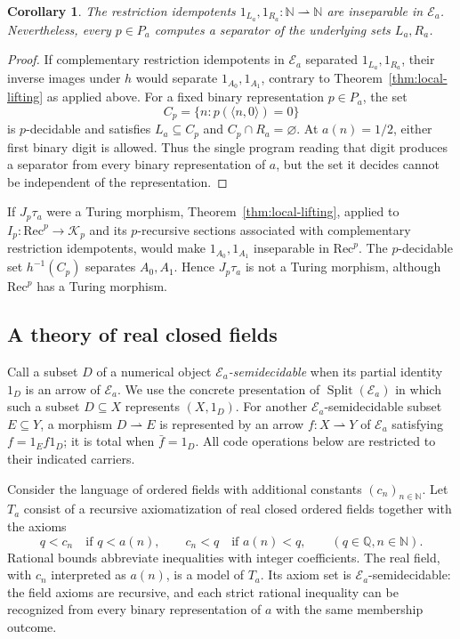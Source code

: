 \documentclass[11pt]{article}
\newtheorem{corollary}[theorem]{Corollary}
\newcommand{\N}{\mathbb N}
\begin{document}
\begin{corollary}\label{cor:miller-cuts-inseparable}
The restriction idempotents $1_{L_a},1_{R_a}:\N\rightharpoonup\N$ are inseparable in
$\mathcal E_a$. Nevertheless, every $p\in P_a$ computes a separator
of the underlying sets $L_a,R_a$.
\end{corollary}
\begin{proof}
If complementary restriction idempotents in $\mathcal E_a$ separated
$1_{L_a},1_{R_a}$, their inverse images under $h$ would separate
$1_{A_0},1_{A_1}$, contrary to
Theorem~\ref{thm:local-lifting} as applied above.
For a fixed binary representation $p\in P_a$, the set
\[
 C_p=\{n:p(\langle n,0\rangle)=0\}
\]
is $p$-decidable and satisfies $L_a\subseteq C_p$ and
$C_p\cap R_a=\varnothing$. At $a(n)=1/2$, either first binary digit
is allowed. Thus the single program reading that digit produces a
separator from every binary representation of $a$, but the set it decides
cannot be independent of the representation.
\end{proof}

If $J_p\tau_a$ were a Turing morphism, Theorem~\ref{thm:local-lifting},
applied to $I_p:\mathrm{Rec}^{p}\to\mathcal K_p$ and its
$p$-recursive sections associated with complementary restriction
idempotents, would make $1_{A_0},1_{A_1}$ inseparable in
$\mathrm{Rec}^{p}$. The $p$-decidable set $h^{-1}(C_p)$ separates
$A_0,A_1$. Hence $J_p\tau_a$ is not a Turing
morphism, although $\mathrm{Rec}^{p}$ has a Turing morphism.


\subsection{A theory of real closed fields}
\label{def:miller-splitting}

Call a subset $D$ of a numerical object \emph{$\mathcal E_a$-semidecidable}
when its partial identity $1_D$ is an arrow of $\mathcal E_a$.
We use the concrete presentation of $\operatorname{Split}(\mathcal E_a)$
in which such a subset $D\subseteq X$ represents $(X,1_D)$.
For another $\mathcal E_a$-semidecidable subset $E\subseteq Y$,
a morphism $D\rightharpoonup E$ is represented by
an arrow $f:X\rightharpoonup Y$ of $\mathcal E_a$ satisfying
$f=1_Ef1_D$; it is total when $\bar f=1_D$.
All code operations below are restricted to their indicated carriers.

Consider the language of ordered fields with additional constants
$(c_n)_{n\in\N}$. Let $T_a$ consist of a recursive axiomatization of
real closed ordered fields together with the axioms
\begin{equation}\label{eq:miller-theory}
 q<c_n\quad\text{if }q<a(n),\qquad
 c_n<q\quad\text{if }a(n)<q,
 \qquad(q\in\mathbb Q, n\in\N).
\end{equation}
Rational bounds abbreviate inequalities with integer coefficients.
The real field, with $c_n$ interpreted as $a(n)$, is a model of $T_a$.
Its axiom set is $\mathcal E_a$-semidecidable: the field axioms are
recursive, and each strict rational inequality can be recognized from
every binary representation of $a$ with the same membership outcome.
\end{document}
